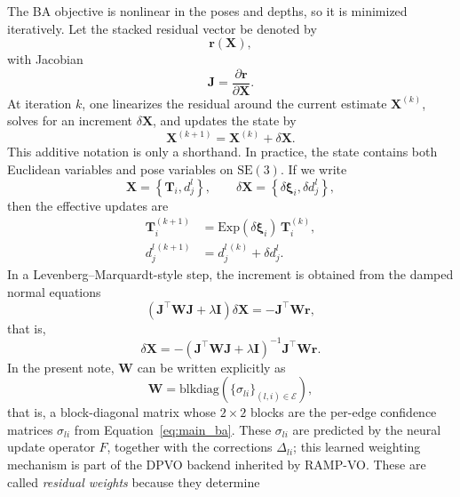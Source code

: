 \documentclass[11pt]{article}
\newcommand{\T}{^{\top}}
\begin{document}
The BA objective is nonlinear in the poses and depths, so it is minimized iteratively. Let the stacked residual vector be denoted by
\begin{equation}
\mathbf{r}(\mathbf{X}),
\end{equation}
with Jacobian
\begin{equation}
\mathbf{J} = \frac{\partial \mathbf{r}}{\partial \mathbf{X}}.
\end{equation}
At iteration \(k\), one linearizes the residual around the current estimate \(\mathbf{X}^{(k)}\), solves for an increment \(\delta \mathbf{X}\), and updates the state by
\begin{equation}
\mathbf{X}^{(k+1)} = \mathbf{X}^{(k)} + \delta \mathbf{X}.
\end{equation}
This additive notation is only a shorthand. In practice, the state contains both Euclidean variables and pose variables on \(\mathrm{SE}(3)\). If we write
\begin{equation}
\mathbf{X} = \left\{\mathbf{T}_i, d_j^l\right\},
\qquad
\delta \mathbf{X} = \left\{\delta \boldsymbol{\xi}_i, \delta d_j^l\right\},
\end{equation}
then the effective updates are
\begin{align}
\mathbf{T}_i^{(k+1)} &= \mathrm{Exp}(\delta \boldsymbol{\xi}_i)\,\mathbf{T}_i^{(k)}, \\
d_j^{l\,(k+1)} &= d_j^{l\,(k)} + \delta d_j^l.
\end{align}
In a Levenberg--Marquardt-style step, the increment is obtained from the damped normal equations
\begin{equation}
\left(\mathbf{J}\T \mathbf{W}\mathbf{J} + \lambda \mathbf{I}\right)\delta \mathbf{X}
= -\mathbf{J}\T \mathbf{W}\mathbf{r},
\end{equation}
that is,
\begin{equation}
\delta \mathbf{X}
= -\left(\mathbf{J}\T \mathbf{W}\mathbf{J} + \lambda \mathbf{I}\right)^{-1}\mathbf{J}\T \mathbf{W}\mathbf{r}.
\end{equation}
In the present note, \(\mathbf{W}\) can be written explicitly as
\begin{equation}
\mathbf{W} = \mathrm{blkdiag}\!\left(\{\sigma_{li}\}_{(l,i)\in\mathcal{E}}\right),
\end{equation}
that is, a block-diagonal matrix whose \(2\times 2\) blocks are the per-edge confidence matrices \(\sigma_{li}\) from Equation~\eqref{eq:main_ba}. These \(\sigma_{li}\) are predicted by the 
neural update operator \(F\), together with the corrections \(\Delta_{li}\); this learned weighting mechanism is part of the DPVO backend inherited by RAMP-VO. These are called \emph{residual weights} because they determine 
\end{document}
